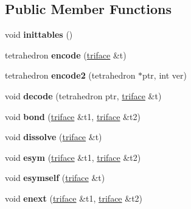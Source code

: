 \subsection*{Public Member Functions}
\begin{DoxyCompactItemize}
\item 
\mbox{\label{classtetgenmesh_af1a7205fe0e5e6256f301e6c47b752b6}} 
void {\bfseries inittables} ()
\item 
\mbox{\label{classtetgenmesh_a7c32f356cc7f0e57f442f9dac4fccb8a}} 
tetrahedron {\bfseries encode} (\hyperlink{classtetgenmesh_1_1triface}{triface} \&t)
\item 
\mbox{\label{classtetgenmesh_a2bc1e8e424ea557d033135dafcf165bb}} 
tetrahedron {\bfseries encode2} (tetrahedron $\ast$ptr, int ver)
\item 
\mbox{\label{classtetgenmesh_a809cfdec35ae9a52670e045823a302c0}} 
void {\bfseries decode} (tetrahedron ptr, \hyperlink{classtetgenmesh_1_1triface}{triface} \&t)
\item 
\mbox{\label{classtetgenmesh_ad7b47aeb5b8d5ab677d86fcafa619a35}} 
void {\bfseries bond} (\hyperlink{classtetgenmesh_1_1triface}{triface} \&t1, \hyperlink{classtetgenmesh_1_1triface}{triface} \&t2)
\item 
\mbox{\label{classtetgenmesh_ac0e0919c3b91b0e55dadbdaae2554074}} 
void {\bfseries dissolve} (\hyperlink{classtetgenmesh_1_1triface}{triface} \&t)
\item 
\mbox{\label{classtetgenmesh_a523cfafc3be8e0ead97a13707b33e4b3}} 
void {\bfseries esym} (\hyperlink{classtetgenmesh_1_1triface}{triface} \&t1, \hyperlink{classtetgenmesh_1_1triface}{triface} \&t2)
\item 
\mbox{\label{classtetgenmesh_a9c4f9877ba70f7c0f399b7fcdd8fdddf}} 
void {\bfseries esymself} (\hyperlink{classtetgenmesh_1_1triface}{triface} \&t)
\item 
\mbox{\label{classtetgenmesh_acf741079840d587ec0d71354cea6e6cf}} 
void {\bfseries enext} (\hyperlink{classtetgenmesh_1_1triface}{triface} \&t1, \hyperlink{classtetgenmesh_1_1triface}{triface} \&t2)

\end{DoxyCompactItemize}

